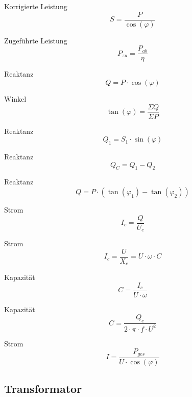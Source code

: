 \documentclass[11pt, a4paper, draft, fleqn, twocolumn]{article}
\numberwithin{equation}{subsection}
\begin{document}
Korrigierte Leistung
\begin{equation}
    S = \frac{P}{\cos(\varphi)}
\end{equation}

\noindent Zugeführte Leistung
\begin{equation}
    P_{zu} = \frac{P_{ab}}{\eta}
\end{equation}

\noindent Reaktanz
\begin{equation}
    Q = P \cdot \cos(\varphi)
\end{equation}

\noindent Winkel
\begin{equation}
    \tan(\varphi) = \frac{\Sigma Q}{\Sigma P}
\end{equation}

\noindent Reaktanz
\begin{equation}
    Q_1 = S_1 \cdot \sin(\varphi)
\end{equation}

\noindent Reaktanz
\begin{equation}
    Q_C = Q_1 - Q_2
\end{equation}

\noindent Reaktanz
\begin{equation}
    Q = P \cdot (\tan(\varphi_1) - \tan(\varphi_2))
\end{equation}

\noindent Strom
\begin{equation}
    I_c = \frac{Q}{U_c}
\end{equation}

\noindent Strom
\begin{equation}
    I_c = \frac{U}{X_c} = U \cdot \omega \cdot C
\end{equation}

\noindent Kapazität
\begin{equation}
    C = \frac{I_c}{U \cdot \omega}
\end{equation}

\noindent Kapazität
\begin{equation}
    C = \frac{Q_c}{2 \cdot \pi \cdot f \cdot U^2}
\end{equation}

\noindent Strom
\begin{equation}
    I = \frac{P_{ges}}{U \cdot \cos(\varphi)}
\end{equation}


\subsection{Transformator}
\end{document}
